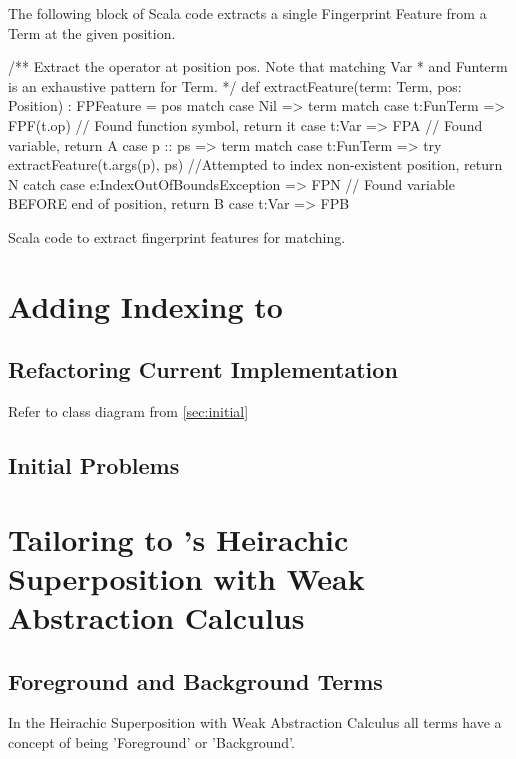 The following block of Scala code extracts a single Fingerprint Feature from
a Term at the given position.
\begin{listing}[H]
\begin{scalacode}
 /** Extract the operator at position pos. Note that matching Var
   * and Funterm is an exhaustive pattern for Term. */
  def extractFeature(term: Term, pos: Position) : FPFeature = pos match {
    case Nil     => term match {
      case t:FunTerm => FPF(t.op) // Found function symbol, return it
      case t:Var     => FPA       // Found variable, return A
    }
    case p :: ps => term match {
      case t:FunTerm => try   {extractFeature(t.args(p), ps) }
                        //Attempted to index non-existent position, return N
                        catch {case e:IndexOutOfBoundsException => FPN}
      // Found variable BEFORE end of position, return B
      case t:Var     => FPB 
    }
  }
\end{scalacode}
\caption{Scala code to extract fingerprint features for matching.}
\label{lst:posextract}
\end{listing}

\section{Adding Indexing to \Beagle}

\subsection{Refactoring Current Implementation}

Refer to class diagram from \ref{sec:initial}

\subsection{Initial Problems}

\section{Tailoring to \Beagle's Heirachic Superposition with Weak Abstraction Calculus}
\label{sec:tailored}

\subsection{Foreground and Background Terms}

In the Heirachic Superposition with Weak Abstraction Calculus all terms have 
a concept of being 'Foreground' or 'Background'.

